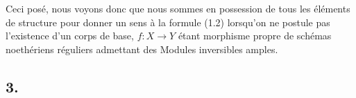 Ceci posé, nous voyons donc que nous sommes en possession de tous les éléments de structure pour donner un sens à la formule (1.2) lorsqu'on ne postule pas l'existence d'un corps de base, $f:X\to Y$ étant morphisme propre de schémas noethériens réguliers admettant des Modules inversibles amples.

\subsection*{3.}
